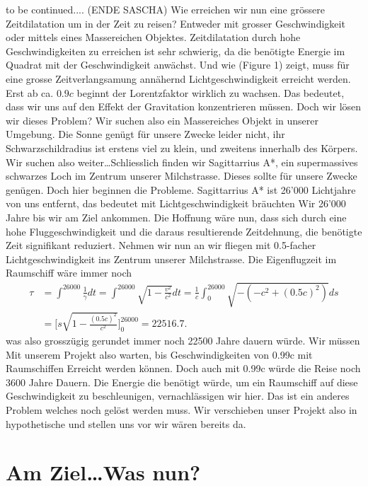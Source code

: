 \begin{refsection}
    to be continued.... (ENDE SASCHA)
	Wie erreichen wir nun eine grössere Zeitdilatation um in der Zeit zu reisen? Entweder mit grosser Geschwindigkeit oder mittels eines Massereichen Objektes. Zeitdilatation durch hohe Geschwindigkeiten zu erreichen ist sehr schwierig, da die benötigte Energie im Quadrat mit der Geschwindigkeit anwächst. Und wie (Figure 1) zeigt, muss für eine grosse Zeitverlangsamung annähernd Lichtgeschwindigkeit erreicht werden. Erst ab ca. $0.9c$ beginnt der Lorentzfaktor wirklich zu wachsen.
	Das bedeutet, dass wir uns auf den Effekt der Gravitation konzentrieren müssen.
	Doch wir lösen wir dieses Problem? Wir suchen also ein Massereiches Objekt in unserer Umgebung. Die Sonne genügt für unsere Zwecke leider nicht, ihr Schwarzschildradius ist erstens viel zu klein, und zweitens innerhalb des Körpers. Wir suchen also weiter\dots Schliesslich finden wir Sagittarrius A*, ein supermassives schwarzes Loch im Zentrum unserer Milchstrasse. Dieses sollte für unsere Zwecke genügen. 
	Doch hier beginnen die Probleme. 
	Sagittarrius A* ist 26'000 Lichtjahre von uns entfernt, das bedeutet mit Lichtgeschwindigkeit bräuchten Wir 26'000 Jahre bis wir am Ziel ankommen. Die Hoffnung wäre nun, dass sich durch eine hohe Fluggeschwindigkeit und die daraus resultierende Zeitdehnung, die benötigte Zeit signifikant reduziert. 
	Nehmen wir nun an wir fliegen mit 0.5-facher Lichtgeschwindigkeit ins Zentrum unserer Milchstrasse. Die Eigenflugzeit im Raumschiff wäre immer noch
	\begin{align*}
	\tau
	&= 
	\int_{}^{26000}\frac{1}{\gamma}dt=\int_{}^{26000}\sqrt{1-\frac{v^2}{c^2}}dt
	= 
	\frac{1}{c}\int_{0}^{26000}\sqrt{-(-c^2+(0.5c)^2)}ds\\
	&=
	\biggl[s\sqrt{1-\frac{(0.5c)^{2}}{c^2}}\biggr]_0^{26000}
	=
	22516.7.
	\end{align*}
	was also grosszügig gerundet immer noch 22500 Jahre dauern würde. 
	Wir müssen Mit unserem Projekt also warten, bis Geschwindigkeiten von 0.99c mit Raumschiffen Erreicht werden können. Doch auch mit 0.99c würde die Reise noch 3600 Jahre Dauern. Die Energie die benötigt würde, um ein Raumschiff auf diese Geschwindigkeit zu beschleunigen, vernachlässigen wir hier. Das ist ein anderes Problem welches noch gelöst werden muss.
	Wir verschieben unser Projekt also in hypothetische und stellen uns vor wir wären bereits da.
	
	\section{Am Ziel\dots Was nun?}
	

\end{refsection}
